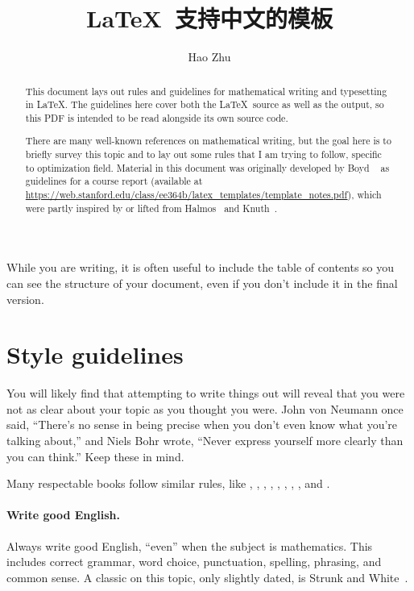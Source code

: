 \documentclass{article}
\title{\LaTeX\ 支持中文的模板}
\author{Hao Zhu}
\affil{Department of Computer Science, University of Freiburg}
\begin{document}
\maketitle

\begin{abstract}
This document lays out rules and guidelines for mathematical writing and typesetting in \LaTeX. 
The guidelines here cover both the \LaTeX\ source as well as the output, so this PDF is intended to be read alongside its own source code.

There are many well-known references on mathematical writing, but the goal here is to briefly survey this topic and to lay out some rules that I am trying to follow, specific to optimization field. 
Material in this document was originally developed by Boyd \etal~\cite{boyd2014latex} as guidelines for a course report (available at \url{https://web.stanford.edu/class/ee364b/latex_templates/template_notes.pdf}), which were partly inspired by or lifted from Halmos~\cite{Halmos:1970} and Knuth~\cite{Knuth:1989}.
\end{abstract}

\newpage
\tableofcontents
\newpage

While you are writing, it is often useful to include the table of contents so you can see the structure of your document, even if you don't include it in the final version.

\section{Style guidelines}

You will likely find that attempting to write things out will reveal that you were not as clear about your topic as you thought you were. 
John von Neumann once said, ``There's no sense in being precise when you don't even know what you're talking about,'' and Niels Bohr wrote, ``Never express yourself more clearly than you can think.''
Keep these in mind.

Many respectable books follow similar rules, like
\cite{BoV:04},
\cite[p.~23]{Cover:1991},
\cite[p.~26]{Hastie:2001},
\cite[p.~21]{Sipser:2001},
\cite[p.~25]{Cormen:2001},
\cite[p.~15]{Rudin:1976},
\cite[p.~18]{Evans:2010},
\cite[p.~3]{Goldstein:1980}, and 
\cite{Knuth:1973}.

\paragraph{Write good English.}
Always write good English, ``even'' when the subject is mathematics. 
This includes correct grammar, word choice, punctuation, spelling, phrasing, and common sense. 
A classic on this topic, only slightly dated, is Strunk and White~\cite{SW:59}.
\end{document}
